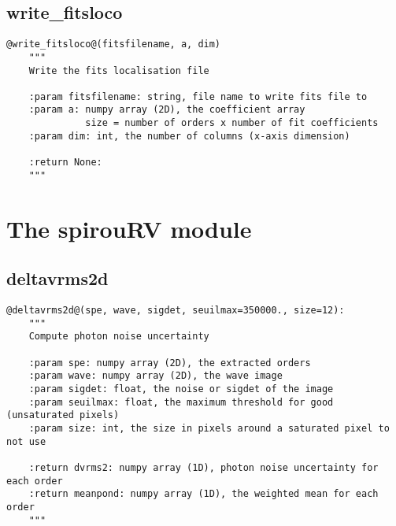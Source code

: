 \vspace{0.5cm}
\subsection{write\_fitsloco}
\begin{lstlisting}[style=pythonstyle]
@write_fitsloco@(fitsfilename, a, dim)
    """
    Write the fits localisation file
    
    :param fitsfilename: string, file name to write fits file to 
    :param a: numpy array (2D), the coefficient array
              size = number of orders x number of fit coefficients
    :param dim: int, the number of columns (x-axis dimension) 
    
    :return None: 
    """
\end{lstlisting}


\clearpage
\newpage
\section{The spirouRV module}

\subsection{deltavrms2d}
\begin{lstlisting}[style=pythonstyle]
@deltavrms2d@(spe, wave, sigdet, seuilmax=350000., size=12):
    """
    Compute photon noise uncertainty
    
    :param spe: numpy array (2D), the extracted orders
    :param wave: numpy array (2D), the wave image
    :param sigdet: float, the noise or sigdet of the image
    :param seuilmax: float, the maximum threshold for good (unsaturated pixels)
    :param size: int, the size in pixels around a saturated pixel to not use
    
    :return dvrms2: numpy array (1D), photon noise uncertainty for each order
    :return meanpond: numpy array (1D), the weighted mean for each order
    """
\end{lstlisting}

\vspace{0.5cm}
\subsection{}

